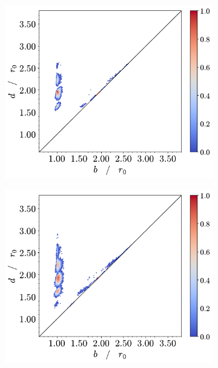\begin{figure}[tb]
	\centering
     
      \begin{subfigure}[b]{0.48\textwidth}
         \centering
         \includegraphics[width=\textwidth]{./figures/ph/t399_bs_pd.pdf}
         \caption{}
         \label{fig:trpda}
     \end{subfigure}
     \hfill
        \begin{subfigure}[b]{0.48\textwidth}
         \centering
         \includegraphics[width=\textwidth]{./figures/ph/t299_bs_pd.pdf}

\end{subfigure}
\end{figure}
